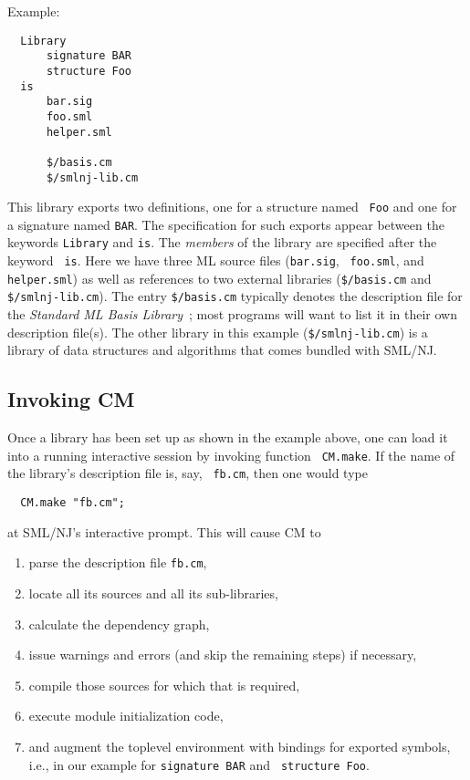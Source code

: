 \documentclass[titlepage,letterpaper]{article}
\begin{document}
\noindent Example:

\begin{verbatim}
  Library
      signature BAR
      structure Foo
  is
      bar.sig
      foo.sml
      helper.sml

      $/basis.cm
      $/smlnj-lib.cm
\end{verbatim}

This library exports two definitions, one for a structure named {\tt
Foo} and one for a signature named {\tt BAR}.  The specification for
such exports appear between the keywords {\tt Library} and {\tt is}.
The {\em members} of the library are specified after the keyword {\tt
is}.  Here we have three ML source files ({\tt bar.sig}, {\tt
foo.sml}, and {\tt helper.sml}) as well as references to two external
libraries ({\tt \$/basis.cm} and {\tt \$/smlnj-lib.cm}).  The entry
{\tt \$/basis.cm} typically denotes the description file for the {\it
Standard ML Basis Library}~\cite{reppy99:basis}; most programs will
want to list it in their own description file(s).  The other library
in this example ({\tt \$/smlnj-lib.cm}) is a library of data
structures and algorithms that comes bundled with SML/NJ.

\subsection{Invoking CM}

Once a library has been set up as shown in the example above, one can
load it into a running interactive session by invoking function {\tt
CM.make}.  If the name of the library's description file is, say, {\tt
fb.cm}, then one would type

\begin{verbatim}
  CM.make "fb.cm";
\end{verbatim}

at SML/NJ's interactive prompt.  This will cause CM to

\begin{enumerate}
\item parse the description file {\tt fb.cm},
\item locate all its sources and all its sub-libraries,
\item calculate the dependency graph,
\item issue warnings and errors (and skip the remaining steps) if
necessary,
\item compile those sources for which that is required,
\item execute module initialization code,
\item and augment the toplevel environment with bindings for exported
symbols, i.e., in our example for {\tt signature BAR} and {\tt
structure Foo}.
\end{enumerate}
\end{document}
